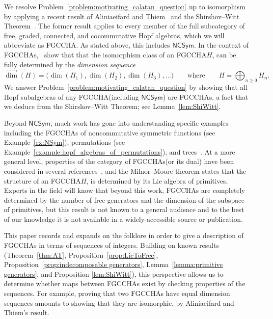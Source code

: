 \documentclass[11pt]{amsart}
\theoremstyle{definition}
\newtheorem{problem}[theorem]{Problem}
\numberwithin{equation}{section}
\newcommand{\FGCCHA}{\textsf{FGCCHA}\xspace}
\newcommand{\FGCCHAs}{\textsf{FGCCHA}s\xspace}
\newcommand{\vecdim}{\overrightarrow{\dim}}
\newcommand{\NCSym}{\mathsf{NCSym}}
\begin{document}
%   

We resolve Problem~\ref{problem:motivating_calatan_question} up to isomorphism by applying a recent result of Aliniaeifard and Thiem~\cite{AT22} and the Shirshov--Witt Theorem~\cite{S09, Witt56}.  
The former result applies to every member of the full subcategory of free, graded, connected, and cocommutative Hopf algebras, which we will abbreviate as \FGCCHA.  
As stated above, this includes $\NCSym$.  
In the context of \FGCCHAs,~\cite[Theorem~4.2]{AT22} show that that the isomorphism class of an
\FGCCHA $H$, can be fully determined by the \emph{dimension sequence}
\[
\vecdim(H) = \big( \dim(H_{1}), \dim(H_{2}), \dim(H_{3}), \ldots \big)
\qquad\text{where}\qquad
H = \bigoplus_{n \ge 0} H_{n}.
\]
We answer Problem~\ref{problem:motivating_calatan_question} by showing that all Hopf subalgebras of any \FGCCHA (including $\NCSym$) are \FGCCHAs, a fact that we deduce from the Shirshov--Witt Theorem; see Lemma~\ref{lem:ShiWitt}.  


Beyond $\NCSym$, much work has gone into understanding specific examples including the \FGCCHAs of noncommutative symmetric functions (see Example~\ref{ex:NSym}), permutations (see Example~\ref{example:hopf_algebras_of_permutations}), and trees~\cite{AS05cc, GL09}.  
At a more general level, properties of the category of \FGCCHAs (or its dual) have been considered in several references~\cite{AT22, Block85, FP24, LodayRonco10, MM65, Reutenauer-FreeLieAlgebras}, and the Milnor--Moore theorem states that the structure of an \FGCCHA $H$, is determined by its Lie algebra of primitives.  
Experts in the field will know that beyond this work, \FGCCHAs are completely determined by the number of free generators and the dimension of the subspace of primitives, but this result is not known to a general audience and to the best of our knowledge it is not available in a widely-accessible source or publication. 

This paper records and expands on the folklore in order to give a description of \FGCCHAs in terms of sequences of integers.  
Building on known results (Theorem~\ref{thm:AT}, Proposition~\ref{prop:LieToFree}, Proposition~\ref{prop:indecomposable generators}, Lemma~\ref{lemma:primitive generators}, and Proposition \ref{lem:ShiWitt}), this perspective allows us to determine whether maps between \FGCCHAs exist by checking properties of the sequences.  
For example, proving that two \FGCCHAs have equal dimension sequences amounts to showing that they are isomorphic, by Aliniaeifard and Thiem's result.
\end{document}
